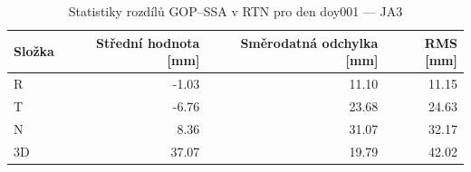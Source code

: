 \begin{table}[H]
\centering
\caption{Statistiky rozdílů GOP–SSA v RTN pro den doy001 — JA3}
\label{tab:j3_ZAZG_doy001_day_stats}
\begin{tabular}{lrrr}
\toprule
Složka & Střední hodnota [mm] & Směrodatná odchylka [mm] & RMS [mm] \\
\midrule
R & -1.03 & 11.10 & 11.15 \\
T & -6.76 & 23.68 & 24.63 \\
N & 8.36 & 31.07 & 32.17 \\
3D & 37.07 & 19.79 & 42.02 \\
\bottomrule
\end{tabular}
\end{table}
